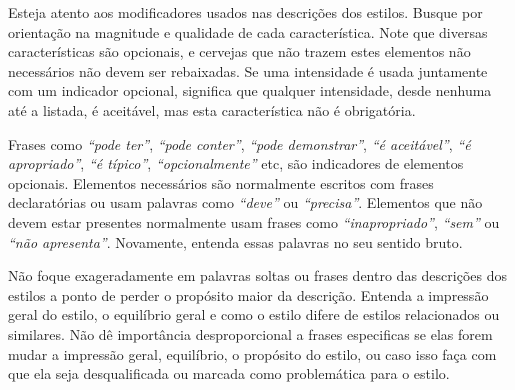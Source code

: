 Esteja atento aos modificadores usados nas descrições dos estilos. Busque por orientação na magnitude e qualidade de cada característica. Note que diversas características são opcionais, e cervejas que não trazem estes elementos não necessários não devem ser rebaixadas. Se uma intensidade é usada juntamente com um indicador opcional, significa que qualquer intensidade, desde nenhuma até a listada, é aceitável, mas esta característica não é obrigatória.

Frases como \textit{“pode ter”}, \textit{“pode conter”}, \textit{“pode demonstrar”}, \textit{“é aceitável”}, \textit{“é apropriado”}, \textit{“é típico”}, \textit{“opcionalmente”} etc, são indicadores de elementos opcionais. Elementos necessários são normalmente escritos com frases declaratórias ou usam palavras como \textit{“deve”} ou \textit{“precisa”}. Elementos que não devem estar presentes normalmente usam frases como \textit{“inapropriado”}, \textit{“sem”} ou \textit{“não apresenta”}. Novamente, entenda essas palavras no seu sentido bruto.

Não foque exageradamente em palavras soltas ou frases dentro das descrições dos estilos a ponto de perder o propósito maior da descrição. Entenda a impressão geral do estilo, o equilíbrio geral e como o estilo difere de estilos relacionados ou similares. Não dê importância desproporcional a frases especificas se elas forem mudar a impressão geral, equilíbrio, o propósito do estilo, ou caso isso faça com que ela seja desqualificada ou marcada como problemática para o estilo.
